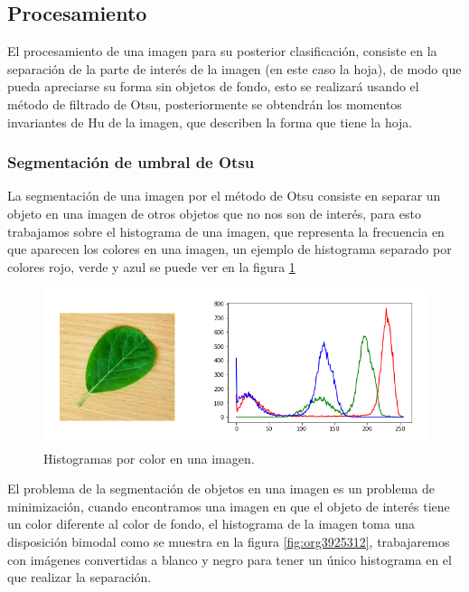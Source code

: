 \documentclass[letter]{article}
\begin{document}
\subsection{Procesamiento}
\label{sec:orgb652142}
El procesamiento de una imagen para su posterior clasificación, consiste en la
separación de la parte de interés de la imagen (en este caso la hoja), de modo
que pueda apreciarse su forma sin objetos de fondo, esto se realizará usando el
método de filtrado de Otsu, posteriormente se obtendrán los momentos invariantes
de Hu de la imagen, que describen la forma que tiene la hoja.

\subsubsection{Segmentación de umbral de Otsu}
\label{sec:orgef20060}
La segmentación de una imagen por el método de Otsu consiste en separar un
objeto en una imagen de otros objetos que no nos son de interés, para esto
trabajamos sobre el histograma de una imagen, que representa la frecuencia en
que aparecen los colores en una imagen, un ejemplo de histograma separado por
colores rojo, verde y azul se puede ver en la figura \ref{fig:org37a67fc}

\begin{figure}[htbp]
\centering
\includegraphics[width=.9\linewidth]{./images/histogram1.png}
\caption{\label{fig:org37a67fc}Histogramas por color en una imagen.}
\end{figure}

El problema de la segmentación de objetos en una imagen es un problema de
minimización, cuando encontramos una imagen en que el objeto de interés tiene un
color diferente al color de fondo, el histograma de la imagen toma una
disposición bimodal \cite{Smith1979} como se muestra en la figura \ref{fig:org3925312}, trabajaremos con
imágenes convertidas a blanco y negro para tener un único histograma en el que
realizar la separación.
\end{document}
